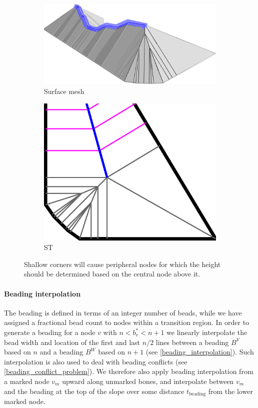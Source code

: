 \begin{figure}\centering
\setlength{\figheight}{.2\columnwidth}
\begin{subfigure}{.55\columnwidth}\centering
\includegraphics[height=\figheight]{sources/method/peripheral_heights_3D.png}
\caption{Surface mesh}
\end{subfigure}
\begin{subfigure}{.4\columnwidth}\centering
\includegraphics[height=\figheight]{sources/method/peripheral_heights.pdf}
\caption{ST}
\end{subfigure}
\caption{
Shallow corners will cause peripheral nodes for which the height should be determined based on the central node above it.
}
\label{peripheral_heights}
\end{figure}


\paragraph{Beading interpolation}
The beading is defined in terms of an integer number of beads, while we have assigned a fractional bead count to nodes within a transition region.
In order to generate a beading for a node $v$ with $n < b^*_v < n+1 $ we linearly interpolate the bead width and location of the first and last $n/2$ lines between a beading $B^V$ based on $n$ and a beading $B^W$ based on $n+1$ (see \cref{beading_interpolation}).
Such interpolation is also used to deal with beading conflicts (see \cref{beading_conflict_problem}).
We therefore also apply beading interpolation from a marked node $v_m$ upward along unmarked bones,
and interpolate between $v_m$ and the beading at the top of the slope over some distance $t_\text{beading}$ from the lower marked node.

